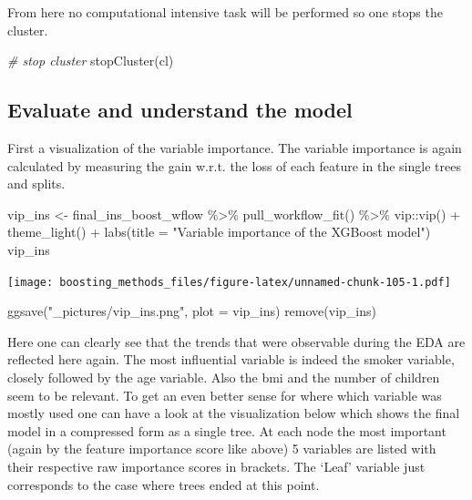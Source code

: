 \documentclass[
]{book}
\newenvironment{Shaded}{\begin{snugshade}}{\end{snugshade}}
\newcommand{\AttributeTok}[1]{\textcolor[rgb]{0.77,0.63,0.00}{#1}}
\newcommand{\CommentTok}[1]{\textcolor[rgb]{0.56,0.35,0.01}{\textit{#1}}}
\newcommand{\FunctionTok}[1]{\textcolor[rgb]{0.00,0.00,0.00}{#1}}
\newcommand{\NormalTok}[1]{#1}
\newcommand{\OtherTok}[1]{\textcolor[rgb]{0.56,0.35,0.01}{#1}}
\newcommand{\SpecialCharTok}[1]{\textcolor[rgb]{0.00,0.00,0.00}{#1}}
\newcommand{\StringTok}[1]{\textcolor[rgb]{0.31,0.60,0.02}{#1}}
\begin{document}
From here no computational intensive task will be performed so one stops the cluster.

\begin{Shaded}
\begin{Highlighting}[]
\CommentTok{\# stop cluster}
\FunctionTok{stopCluster}\NormalTok{(cl)}
\end{Highlighting}
\end{Shaded}

\hypertarget{evaluate-and-understand-the-model-1}{%
\subsection{Evaluate and understand the model}\label{evaluate-and-understand-the-model-1}}

First a visualization of the variable importance. The variable importance is again calculated by measuring the gain w.r.t. the loss of each feature in the single trees and splits.

\begin{Shaded}
\begin{Highlighting}[]
\NormalTok{vip\_ins }\OtherTok{\textless{}{-}}\NormalTok{ final\_ins\_boost\_wflow }\SpecialCharTok{\%\textgreater{}\%}
  \FunctionTok{pull\_workflow\_fit}\NormalTok{() }\SpecialCharTok{\%\textgreater{}\%}
\NormalTok{  vip}\SpecialCharTok{::}\FunctionTok{vip}\NormalTok{() }\SpecialCharTok{+} 
  \FunctionTok{theme\_light}\NormalTok{() }\SpecialCharTok{+}
  \FunctionTok{labs}\NormalTok{(}\AttributeTok{title =} \StringTok{"Variable importance of the XGBoost model"}\NormalTok{)}
\NormalTok{vip\_ins}
\end{Highlighting}
\end{Shaded}

\texttt{[image: boosting\_methods\_files/figure-latex/unnamed-chunk-105-1.pdf]}

\begin{Shaded}
\begin{Highlighting}[]
\FunctionTok{ggsave}\NormalTok{(}\StringTok{"\_pictures/vip\_ins.png"}\NormalTok{, }\AttributeTok{plot =}\NormalTok{ vip\_ins)}
\FunctionTok{remove}\NormalTok{(vip\_ins)}
\end{Highlighting}
\end{Shaded}

Here one can clearly see that the trends that were observable during the EDA are reflected here again. The most influential variable is indeed the smoker variable, closely followed by the age variable. Also the bmi and the number of children seem to be relevant. To get an even better sense for where which variable was mostly used one can have a look at the visualization below which shows the final model in a compressed form as a single tree. At each node the most important (again by the feature importance score like above) 5 variables are listed with their respective raw importance scores in brackets. The `Leaf' variable just corresponds to the case where trees ended at this point.
\end{document}
